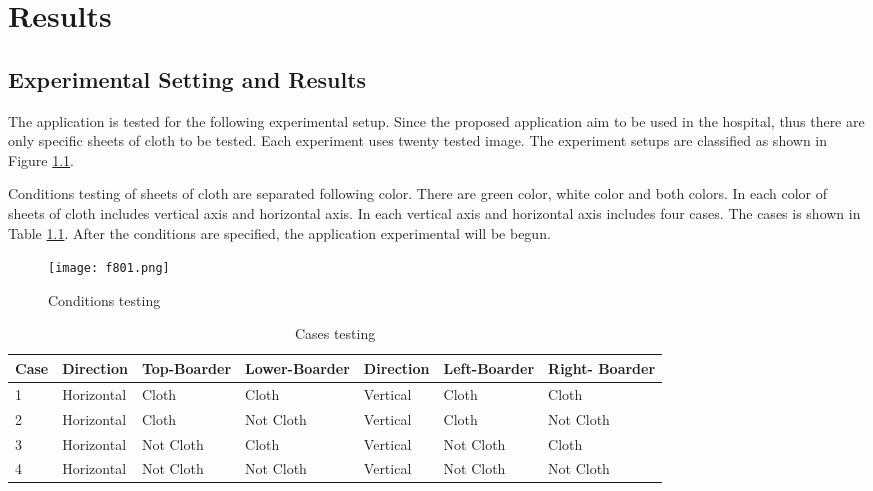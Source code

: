 
\chapter{Results} %

\label{Chapter8} %



\section{Experimental Setting and Results}

The application is tested for the following experimental setup. Since the proposed application aim to be used in the hospital, thus there are only specific sheets of cloth to be tested. Each experiment uses twenty tested image. The experiment setups are classified as shown in Figure \ref{fig:f801}.

Conditions testing of sheets of cloth are separated following color. There are green color, white color and both colors. In each color of sheets of cloth includes vertical axis and horizontal axis. In each vertical axis and horizontal axis includes four cases. The cases is shown in Table \ref{tab:t801}. After the conditions are specified, the application experimental will be begun.
\begin{figure}[t]
	\centering
	\texttt{[image: f801.png]}
	\caption{Conditions testing}
	\label{fig:f801}
\end{figure}
\begin{table}[t]
	\centering
	\begin{tabular}{|l|l|l|l|l|l|l|}
		\hline
		Case & Direction & Top-Boarder & Lower-Boarder & Direction & Left-Boarder & Right- Boarder\\
		\hline
		1 & Horizontal & Cloth & Cloth & Vertical & Cloth & Cloth\\
		\hline
		2 & Horizontal & Cloth & Not Cloth & Vertical & Cloth & Not Cloth\\
		\hline
		3 & Horizontal & Not Cloth & Cloth & Vertical & Not Cloth & Cloth\\
		\hline
		4 & Horizontal & Not Cloth & Not Cloth & Vertical & Not Cloth & Not Cloth\\
		\hline
	\end{tabular}
	\caption{Cases testing}
	\label{tab:t801}
\end{table}

